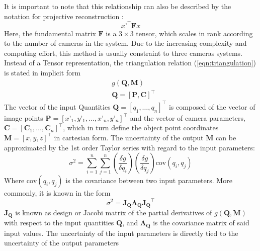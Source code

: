 \documentclass[5p,times,procedia]{elsarticle}
\begin{document}
It is important to note that this relationship can also be described by the notation for projective reconstruction \cite{Hartley2018}:\\
%
\begin{equation}
	\label{eqn:ProjectiveReconstruction}
	x’^{\top}\mathbf{F}x
\end{equation}
%
Here, the fundamental matrix $\mathbf{F}$ is a $3\times 3$ tensor, which scales in rank according to the number of cameras in the system. Due to the increasing complexity and computing effort, this method is usually constraint to three cameras systems. Instead of a Tensor representation, the triangulation relation (\ref{eqn:triangulation}) is stated in implicit form\\
%
\begin{equation}
	\label{eqn:ImplicitFrom}
	\begin{aligned}
		& g(\mathbf{Q},\mathbf{M}) \\
		& \mathbf{Q} = [\mathbf{P},\mathbf{C}]^{\top}
	\end{aligned}
\end{equation}
%
The vector of the input Quantities $\mathbf{Q} = \left[q_1,\dots, q_{n}\right]^{\top}$ is composed of the vector of image points $\mathbf{P} = [x’_1,y’_1, \dots ,x’_n,y’_n]^{\top}$ and the vector of camera parameters, $\mathbf{C} = \left[ \mathbf{C}_1 , \dots , \mathbf{C}_n \right]^{\top}$, which in turn define the object point coordinates $\mathbf{M} =  [x,y,z]^{\top}$ in cartesian form. The uncertainty of the output $\mathbf{M}$ can be approximated by the 1st order Taylor series with regard to the input parameters:\\
%
\begin{equation}
	\sigma^2 = \sum_{i=1}^{n}\sum_{j=1}^{n} \left(\frac{\delta g}{\delta q_i}\right) \left(\frac{\delta g}{\delta q_j}\right) \mathrm{cov}(q_i, q_j) 
\end{equation}
%
Where $\mathrm{cov}(q_i, q_j) $ is the covariance between two input parameters. More commonly, it is known in the form~\cite{Cox2006}
%
\begin{equation}
	\sigma^2 = \mathbf{J_{Q}}\mathbf{\Lambda_{Q}}\mathbf{J_{Q}}^{\top}
\end{equation}
%
$\mathbf{J_{Q}}$ is known as design or Jacobi matrix of the partial derivatives of $g\left(\mathbf{Q},\mathbf{M}\right)$ with respect to the input quantities $\mathbf{Q}$, and $\mathbf{\Lambda_Q}$ is the covariance matrix of said input values. The uncertainty of the input parameters is directly tied to the uncertainty of the output parameters\\
\end{document}
